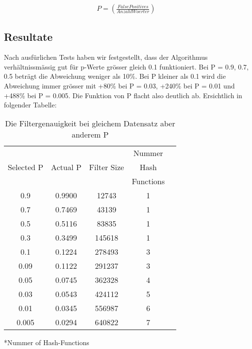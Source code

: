 \documentclass[11pt]{article}
\begin{document}
    \begin{align*}
    P = (\frac{False Positives}{Anzahl Woerter})
    \end{align*}

    \newpage
    \subsection{Resultate}
    Nach ausf{\"u}rlichen Tests haben wir festgestellt, dass der Algorithmus verh{\"a}ltnissm{\"a}ssig  gut f{\"u}r p-Werte gr{\"o}sser gleich 0.1 funktioniert.
    \newline
    Bei P = 0.9, 0.7, 0.5 betr{\"a}gt die Abweichung weniger als 10\%.
    \newline
    Bei P kleiner als 0.1 wird die Abweichung immer gr{\"o}sser mit +80\% bei P = 0.03, +240\% bei P = 0.01 und +488\% bei P = 0.005.
    \newline
    Die Funktion von P flacht also deutlich ab.
    \medskip
    \newline
    Ersichtlich in folgender Tabelle:
    \newline
    \medskip
    \begin{table}[htp]
        \label{tab:summary}
        \begin{center}
            \begin{tabular}{ccccc}
                \hline
                &                 &             &Nummer     \\
                Selected P  & Actual P        & Filter Size &Hash       \\
                &                 &             &Functions	\\
                \hline

                0.9         & 0.9900          &  12743       & 1  	\\
                0.7         & 0.7469          &  43139       & 1  	\\
                0.5         & 0.5116          &  83835       & 1  	\\
                0.3         & 0.3499          &  145618      & 1  	\\
                0.1         & 0.1224          &  278493      & 3  	\\
                0.09        & 0.1122          &  291237      & 3  	\\
                0.05        & 0.0745          &  362328      & 4    \\
                0.03        & 0.0543          &  424112      & 5  	\\
                0.01        & 0.0345          &  556987      & 6  	\\
                0.005       & 0.0294          &  640822      & 7  	\\
                \hline
            \end{tabular}
            *Nummer of Hash-Functions
        \end{center}
        \caption{Die Filtergenauigkeit bei gleichem Datensatz aber anderem P}
    \end{table}
\end{document}
